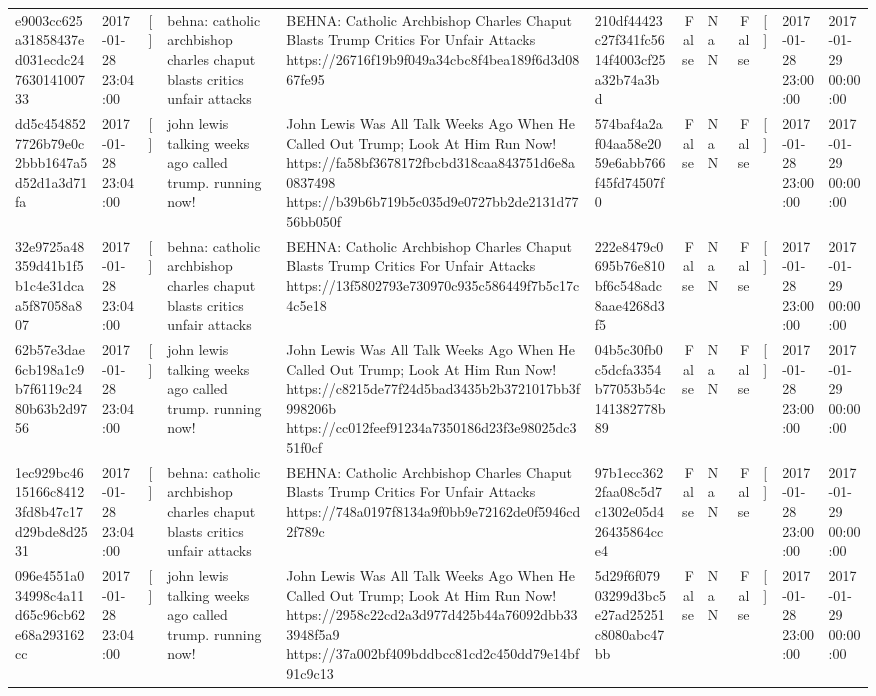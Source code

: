 \begin{tabular}{llllllrlrlll}
e9003cc625a31858437ed031ecdc24763014100733 & 2017-01-28 23:04:00 & [] & behna: catholic archbishop charles chaput blasts critics unfair attacks & BEHNA: Catholic Archbishop Charles Chaput Blasts Trump Critics For Unfair Attacks https://26716f19b9f049a34cbc8f4bea189f6d3d0867fe95 & 210df44423c27f341fc5614f4003cf25a32b74a3bd & False & NaN & False & [] & 2017-01-28 23:00:00 & 2017-01-29 00:00:00 \\
dd5c4548527726b79e0c2bbb1647a5d52d1a3d71fa & 2017-01-28 23:04:00 & [] & john lewis talking weeks ago called trump. running now! & John Lewis Was All Talk Weeks Ago When He Called Out Trump; Look At Him Run Now! https://fa58bf3678172fbcbd318caa843751d6e8a0837498 https://b39b6b719b5c035d9e0727bb2de2131d7756bb050f & 574baf4a2af04aa58e2059e6abb766f45fd74507f0 & False & NaN & False & [] & 2017-01-28 23:00:00 & 2017-01-29 00:00:00 \\
32e9725a48359d41b1f5b1c4e31dcaa5f87058a807 & 2017-01-28 23:04:00 & [] & behna: catholic archbishop charles chaput blasts critics unfair attacks & BEHNA: Catholic Archbishop Charles Chaput Blasts Trump Critics For Unfair Attacks https://13f5802793e730970c935c586449f7b5c17c4c5e18 & 222e8479c0695b76e810bf6c548adc8aae4268d3f5 & False & NaN & False & [] & 2017-01-28 23:00:00 & 2017-01-29 00:00:00 \\
62b57e3dae6cb198a1c9b7f6119c2480b63b2d9756 & 2017-01-28 23:04:00 & [] & john lewis talking weeks ago called trump. running now! & John Lewis Was All Talk Weeks Ago When He Called Out Trump; Look At Him Run Now! https://c8215de77f24d5bad3435b2b3721017bb3f998206b https://cc012feef91234a7350186d23f3e98025dc351f0cf & 04b5c30fb0c5dcfa3354b77053b54c141382778b89 & False & NaN & False & [] & 2017-01-28 23:00:00 & 2017-01-29 00:00:00 \\
1ec929bc4615166c84123fd8b47c17d29bde8d2531 & 2017-01-28 23:04:00 & [] & behna: catholic archbishop charles chaput blasts critics unfair attacks & BEHNA: Catholic Archbishop Charles Chaput Blasts Trump Critics For Unfair Attacks https://748a0197f8134a9f0bb9e72162de0f5946cd2f789c & 97b1ecc3622faa08c5d7c1302e05d426435864cce4 & False & NaN & False & [] & 2017-01-28 23:00:00 & 2017-01-29 00:00:00 \\
096e4551a034998c4a11d65c96cb62e68a293162cc & 2017-01-28 23:04:00 & [] & john lewis talking weeks ago called trump. running now! & John Lewis Was All Talk Weeks Ago When He Called Out Trump; Look At Him Run Now! https://2958c22cd2a3d977d425b44a76092dbb333948f5a9 https://37a002bf409bddbcc81cd2c450dd79e14bf91c9c13 & 5d29f6f07903299d3bc5e27ad25251c8080abc47bb & False & NaN & False & [] & 2017-01-28 23:00:00 & 2017-01-29 00:00:00 \\

\end{tabular}
